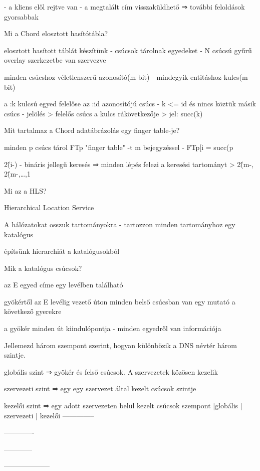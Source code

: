 \documentclass[12pt]{article}
\begin{document}
\begin{description}[style=unboxed]
        - a kliens elől rejtve van
        - a megtalált cím visszaküldhető ⇒ további feloldások gyorsabbak
    \item  Mi a Chord elosztott hasítótábla?
    \item elosztott hasított táblát készítünk
        - csúcsok tárolnak egyedeket
        - N csúcsú gyűrű overlay szerkezetbe van szervezve
    \item minden csúcshoz véletlenszerű azonosító(m bit)
        - mindegyik entitáshoz kulcs(m bit)
    \item a :k kulcsú egyed felelőse az :id azonosítójú csúcs
        - k <= id és nincs köztük másik csúcs
        - jelölés
        > felelős csúcs a kulcs rákövetkezője
        > jel: succ(k)
    \item  Mit tartalmaz a Chord adatábrázolás egy finger table-je?
    \item minden p csúcs tárol FTp "finger table" -t m bejegyzéssel
        - FTp[i = succ(p\item2\^(i-)
        - bináris jellegű keresés ⇒ minden lépés felezi a keresési tartományt
        > 2\^(m-, 2\^(m-,\ldots,1
    \item  Mi az a HLS?
    \item Hierarchical Location Service
    \item A hálózatokat osszuk tartományokra
        - tartozzon minden tartományhoz egy katalógus
    \item építsünk hierarchiát a katalógusokból
    \item  Mik a katalógus csúcsok?
    \item az E egyed címe egy levélben található
    \item gyökértől az E levélig vezető úton minden belső csúcsban van egy mutató a következő gyerekre
    \item a gyökér minden út kiindulópontja
        - minden egyedről van információja
    \item  Jellemezd három szempont szerint, hogyan különbözik a DNS névtér három szintje.
    \item globális szint   ⇒ gyökér és felső csúcsok. A szervezetek közösen kezelik
    \item szervezeti szint ⇒ egy egy szervezet által kezelt csúcsok szintje
    \item kezelői szint    ⇒ egy adott szervezeten belül kezelt csúcsok
        szempont      |globális     | szervezeti | kezelői
        --------------\item-------------\item------------\item--------------------

\end{description}
\end{document}
